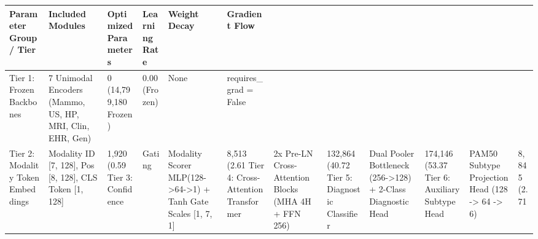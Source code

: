 \begin{tabular}{llllll}
\toprule
Parameter Group / Tier & Included Modules & Optimized Parameters & Learning Rate & Weight Decay & Gradient Flow \\
\midrule
Tier 1: Frozen Backbones & 7 Unimodal Encoders (Mammo, US, HP, MRI, Clin, EHR, Gen) & 0 (14,799,180 Frozen) & 0.00 (Frozen) & None & requires_grad = False \\
Tier 2: Modality Token Embeddings & Modality ID [7, 128], Pos [8, 128], CLS Token [1, 128] & 1,920 (0.59%
Tier 3: Confidence & Gating & Modality Scorer MLP(128->64->1) + Tanh Gate Scales [1, 7, 1] & 8,513 (2.61%
Tier 4: Cross-Attention Transformer & 2x Pre-LN Cross-Attention Blocks (MHA 4H + FFN 256) & 132,864 (40.72%
Tier 5: Diagnostic Classifier & Dual Pooler Bottleneck (256->128) + 2-Class Diagnostic Head & 174,146 (53.37%
Tier 6: Auxiliary Subtype Head & PAM50 Subtype Projection Head (128 -> 64 -> 6) & 8,845 (2.71%
\bottomrule
\end{tabular}

